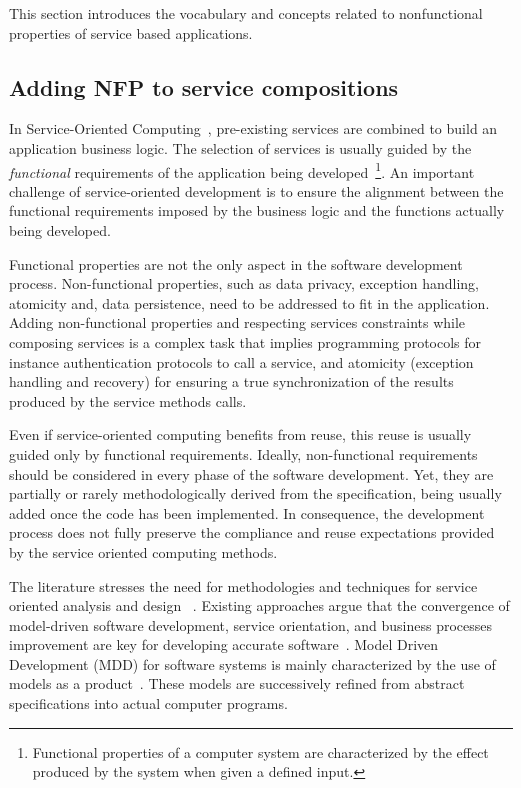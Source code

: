 
This section introduces the vocabulary and concepts related to nonfunctional properties of service based applications.

\subsection{Adding NFP to service compositions}
In Service-Oriented Computing~\cite{Papazoglou2007}, pre-existing services are
combined to build an application business logic.
The selection of services is usually guided by the \textit{functional} requirements of the application being developed~\cite{2,decastro1,PapazoglouH06}\footnote{Functional properties of a computer system are characterized by the effect produced by the system when given a defined input.}.
An important challenge of service-oriented development is  to ensure the alignment between the functional requirements imposed by the business logic and the functions actually being developed.

Functional properties are not the only  aspect in the software development process.
Non-functional properties, such as data privacy, exception handling, atomicity  and, data persistence, need to be addressed  to fit in the application.
Adding non-functional properties and respecting services constraints while composing services is a complex task that implies programming  protocols for instance authentication protocols to call a service, and atomicity (exception handling and recovery) for ensuring a true synchronization of the results produced by the service methods calls.

Even if service-oriented computing benefits from reuse, this reuse is usually guided only by functional requirements. 
Ideally, non-functional requirements should be considered in every phase of the software development.
Yet,  they are partially or rarely methodologically derived from the specification, being usually added once the code has been implemented. 
In consequence, the development process does not fully preserve the compliance and reuse expectations provided by the service oriented computing methods.


The literature stresses the need for methodologies and techniques for service oriented analysis and design 
~\cite{Papazoglou2007}. 
Existing approaches argue that the convergence of model-driven software development, service orientation,   and  business processes improvement are key for developing accurate  software~\cite{watson}. 
Model Driven Development (MDD)  for software systems is mainly characterized by the use of models as a product~\cite{Selic03}.
These models are successively refined from abstract specifications into actual computer programs.

